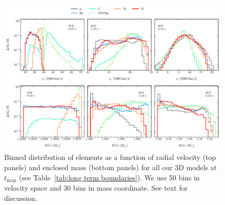 \documentclass[fleqn,usenatbib]{mnras}
\newcommand{\onemg}{\ensuremath{\mathrm{e8.8}}\xspace}
\begin{document}
\begin{figure}
 \centering
 \includegraphics[width=\textwidth,trim=0.0cm 0.0cm 0cm 0cm,clip]{pic/z96_s9_e8_3d_massDis_mvr_and_masstime_0_paper.pdf}
 \caption{Binned distribution of elements as a function of radial velocity (top panels) and enclosed mass (bottom panels) for all our 3D models at $t_{\mathrm{map}}$ (see Table~\ref{tab:long term boundaries}). We use 50 bins in velocity space and 30 bins in mass coordinate. See text for discussion.}
 \label{fig:mdp first mapping}
\end{figure}

\end{document}
